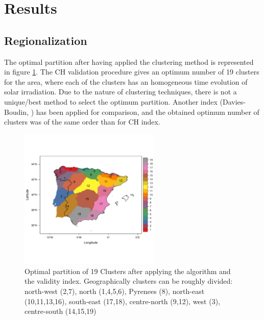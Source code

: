 

\section{Results}

\subsection{Regionalization}

The optimal partition after having applied the clustering method is represented in figure \ref{clusters}. The CH validation procedure gives an optimum number of 19 clusters for the area, where each of the clusters has an homogeneous time evolution of solar irradiation. Due to the nature of clustering techniques, there is not a unique/best method to select the optimum partition. Another index (Davies-Boudin, \cite{davies1979cluster}) has been applied for comparison, and the obtained optimum number of clusters was of the same order than for CH index.
 
\begin{figure}[h!]
\centering\includegraphics[width=0.6\textwidth]{figs/capitulo5/clusters2}
\caption[Optimal partition of clusters over the Iberian Peninsula]{Optimal partition of 19 Clusters after applying the algorithm and the validity index. Geographically clusters can be roughly divided: north-west (2,7), north (1,4,5,6), Pyrenees (8), north-east (10,11,13,16), south-east (17,18), centre-north (9,12), west (3), centre-south (14,15,19)}
\label{clusters}
\end{figure}

